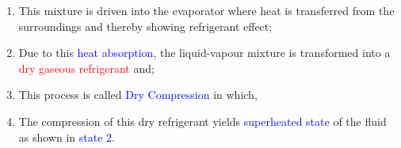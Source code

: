 \documentclass[10pt,compress]{beamer}
\begin{document}
\begin{frame}
\begin{columns}
\begin{column}[c]{0.5\linewidth}
\begin{enumerate}[(1)]
   \item <2-> This mixture is driven into the evaporator where heat is transferred from the surroundings and thereby showing refrigerant effect; 
   \item <2-> Due to this \textcolor{blue}{heat absorption}, the liquid-vapour mixture is transformed into a \textcolor{red}{dry gaseous refrigerant} and;
   \item <3-> This process is called \textcolor{blue}{Dry Compression} in which,
   \item <3-> The compression of this dry refrigerant yields \textcolor{blue}{superheated state} of the fluid as shown in \textcolor{blue}{state 2}.
  \end{enumerate}
 \end{column}  
\end{columns}
\end{frame}
\end{document}
